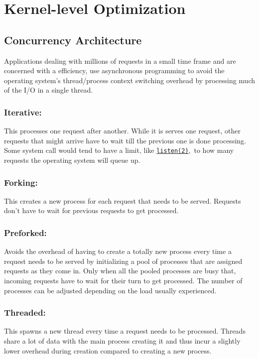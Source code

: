 \documentclass[
	a4paper,
	10pt,
	unnumberedsections,
	twoside, 
]{LTJournalArticle}
\begin{document}
\section{Kernel-level Optimization}
\subsection{Concurrency Architecture}
Applications dealing with millions of requests in a small time frame and are concerned with a efficiency, use asynchronous programming to avoid the operating system’s thread/process context switching overhead by processing much of the I/O in a single thread. 

\subsubsection{Iterative:}
This processes one request after another. While it is serves one request, other requests that might arrive have to wait till the previous one is done processing. 
Some system call would tend to have a limit, like \href{http://man7.org/linux/man-pages/man2/listen.2.html}{\texttt{listen(2)}}, to how many requests the operating system will queue up.

\subsubsection{Forking:}
This creates a new process for each request that needs to be served. Requests don’t have to wait for previous requests to get processed. 

\subsubsection{Preforked:}
Avoids the overhead of having to create a totally new process every time a request needs to be served by initializing a pool of processes that are assigned requests as they come in. Only when all the pooled processes are busy that, incoming requests have to wait for their turn to get processed. The number of processes can be adjusted depending on the load usually experienced.

\subsubsection{Threaded:}
This spawns a new thread every time a request needs to be processed. Threads share a lot of data with the main process creating it and thus incur a slightly lower overhead during creation compared to creating a new process.
\end{document}

